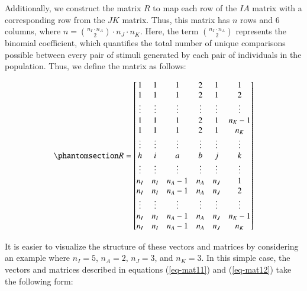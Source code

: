 \documentclass[
  authoryear,
  review,
  1p]{elsarticle}
\begin{document}
Additionally, we construct the matrix \(R\) to map each row of the
\(IA\) matrix with a corresponding row from the \(JK\) matrix. Thus,
this matrix has \(n\) rows and \(6\) columns, where
\(n = {n_{I} \cdot n_{A} \choose 2} \cdot n_{J} \cdot n_{K}\). Here, the
term \({n_{I} \cdot n_{A} \choose 2}\) represents the binomial
coefficient, which quantifies the total number of unique comparisons
possible between every pair of stimuli generated by each pair of
individuals in the population. Thus, we define the matrix as follows:

\begin{equation}\phantomsection\label{eq-mat12}{
R = \begin{bmatrix}
1 & 1 & 1 & 2 & 1 & 1 \\
1 & 1 & 1 & 2 & 1 & 2 \\
\vdots & \vdots & \vdots & \vdots & \vdots & \vdots\\
1 & 1 & 1 & 2 & 1 & n_{K}-1 \\
1 & 1 & 1 & 2 & 1 & n_{K} \\
\vdots & \vdots & \vdots & \vdots & \vdots & \vdots\\
h & i & a & b & j & k \\
\vdots & \vdots & \vdots & \vdots & \vdots & \vdots\\
n_{I} & n_{I} & n_{A}-1 & n_{A} & n_{J} & 1 \\
n_{I} & n_{I} & n_{A}-1 & n_{A} & n_{J} & 2 \\
\vdots & \vdots & \vdots & \vdots & \vdots & \vdots\\
n_{I} & n_{I} & n_{A}-1 & n_{A} & n_{J} & n_{K}-1 \\
n_{I} & n_{I} & n_{A}-1 & n_{A} & n_{J} & n_{K} \\
\end{bmatrix}
}\end{equation}

It is easier to visualize the structure of these vectors and matrices by
considering an example where \(n_{I} = 5\), \(n_{A} = 2\),
\(n_{J} = 3\), and \(n_{K} = 3\). In this simple case, the vectors and
matrices described in equations (\ref{eq-mat11}) and (\ref{eq-mat12})
take the following form:
\end{document}
